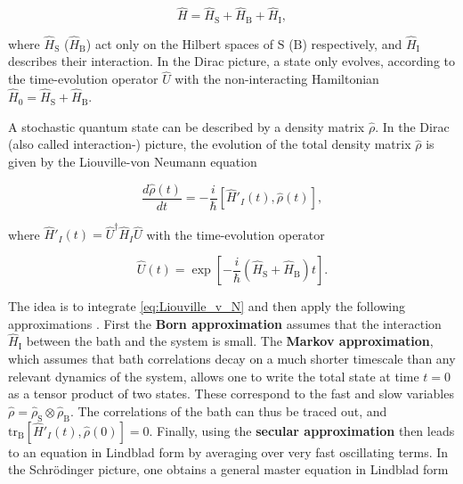 \begin{equation} \label{eq:Hamiltonean_H_S_H_B_H_I}
\hat{H} = \hat{H}_{\text{S}} + \hat{H}_{\text{B}} + \hat{H}_{\text{I}},
\end{equation}

\noindent
where $\hat{H}_{\text{S}}$ ($\hat{H}_{\text{B}}$) act only on the Hilbert spaces of $\text{S}$ ($\text{B}$) respectively, and $\hat{H}_{\text{I}}$ describes their interaction.
In the Dirac picture, a state only evolves, according to the time-evolution operator $ \hat{U} $ with the non-interacting Hamiltonian
$\hat{H}_{\text{0}} = \hat{H}_{\text{S}} + \hat{H}_{\text{B}}$.

\noindent
A stochastic quantum state can be described by a density matrix $\hat{\rho}$.
In the Dirac (also called interaction-) picture,
the evolution of the total density matrix $\hat{\rho}$ is given by the Liouville-von Neumann equation \cite{Manzano_2020}

\begin{equation}\label{eq:Liouville_v_N}
\frac{d\hat{\rho}(t)}{dt} = -\frac{i}{\hbar}  \left[ \hat{H}'_I(t), \hat{\rho}(t) \right],
\end{equation}

\noindent
where $\hat{H}'_I(t) = \hat{U}^{\dagger} \hat{H}_I \hat{U}$
with the time-evolution operator

\begin{equation} \label{eq:Time_evolution_op}
\hat{U}(t) = \exp \left[ -\frac{i}{\hbar} \left( \hat{H}_{\text{S}} + \hat{H}_{\text{B}} \right) t \right] \text{.}
\end{equation}

\noindent
The idea is to integrate \autoref{eq:Liouville_v_N} and then apply the following approximations \cite{Breuer2002}.
First the \textbf{Born approximation} assumes that the interaction $\hat{H}_{\text{I}}$ between the bath and the system is small.
The \textbf{Markov approximation},
which assumes that bath correlations decay on a much shorter timescale than any relevant dynamics of the system,
allows one to write the total state at time $t = 0$ as a tensor product of two states.
These correspond to the fast and slow variables $\hat{\rho} = \hat{\rho}_{\text{S}} \otimes \hat{\rho}_{\text{B}}$.
The correlations of the bath can thus be traced out, and $\text{tr}_\text{B}[\hat{H}'_I(t), \hat{\rho}(0)]=0$.
Finally, using the \textbf{secular approximation} then leads to an equation in Lindblad form by averaging over very fast oscillating terms.
In the Schrödinger picture, one obtains a general master equation in Lindblad form

